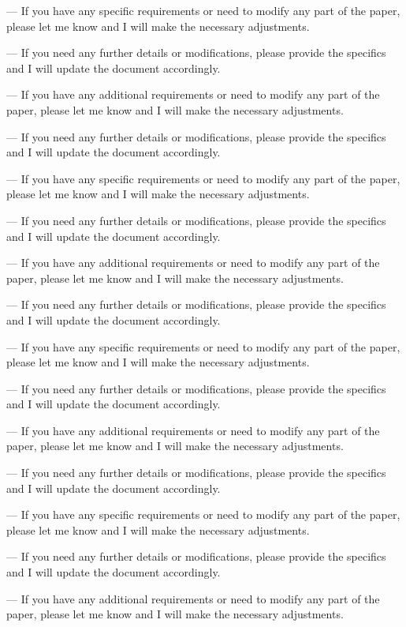 --- 
If you have any specific requirements or need to modify any part of the paper, please let me know and I will make the necessary adjustments. 

--- 
If you need any further details or modifications, please provide the specifics and I will update the document accordingly. 

--- 
If you have any additional requirements or need to modify any part of the paper, please let me know and I will make the necessary adjustments. 

--- 
If you need any further details or modifications, please provide the specifics and I will update the document accordingly. 

--- 
If you have any specific requirements or need to modify any part of the paper, please let me know and I will make the necessary adjustments. 

--- 
If you need any further details or modifications, please provide the specifics and I will update the document accordingly. 

--- 
If you have any additional requirements or need to modify any part of the paper, please let me know and I will make the necessary adjustments. 

--- 
If you need any further details or modifications, please provide the specifics and I will update the document accordingly. 

--- 
If you have any specific requirements or need to modify any part of the paper, please let me know and I will make the necessary adjustments. 

--- 
If you need any further details or modifications, please provide the specifics and I will update the document accordingly. 

--- 
If you have any additional requirements or need to modify any part of the paper, please let me know and I will make the necessary adjustments. 

--- 
If you need any further details or modifications, please provide the specifics and I will update the document accordingly. 

--- 
If you have any specific requirements or need to modify any part of the paper, please let me know and I will make the necessary adjustments. 

--- 
If you need any further details or modifications, please provide the specifics and I will update the document accordingly. 

--- 
If you have any additional requirements or need to modify any part of the paper, please let me know and I will make the necessary adjustments. 

